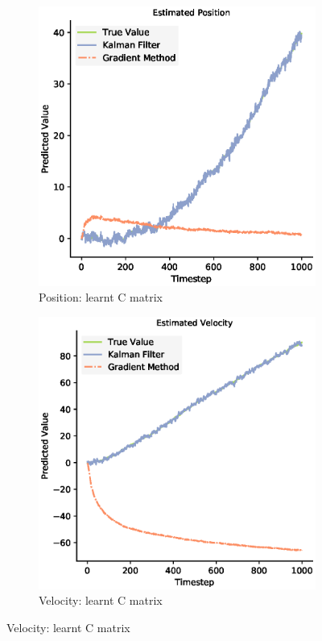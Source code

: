 \begin{figure}
\label{KF_learn_C_figure}
  \begin{subfigure}{0.33\textwidth}
    \centering
    \includegraphics[width=.8\linewidth]{chapter_3_figures/Estimated_Position_C_matrix.eps}
    \caption{Position: learnt C matrix}
  \end{subfigure}%
  \begin{subfigure}{0.33\textwidth}
    \centering
    \includegraphics[width=.8\linewidth]{chapter_3_figures/Estimated_Velocity_C_matrix.eps}
    \caption{Velocity: learnt C matrix}
  \end{subfigure}

\end{figure}
